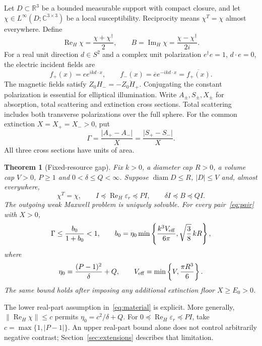 \documentclass[11pt]{article}
\newtheorem{theorem}{Theorem}[section]
\newcommand{\ReH}{\operatorname{Re}_{\!H}}
\newcommand{\ImH}{\operatorname{Im}_{\!H}}
\newcommand{\norm}[1]{\lVert #1\rVert}
\newcommand{\abs}[1]{\lvert #1\rvert}
\begin{document}
Let $D\subset\mathbb R^3$ be a bounded measurable support with compact closure, and let $\chi\in L^\infty(D;\mathbb C^{3\times3})$ be a local susceptibility. Reciprocity means $\chi^T=\chi$ almost everywhere. Define
\[
 \ReH\chi=\frac{\chi+\chi^\dagger}{2},\qquad
 B=\ImH\chi=\frac{\chi-\chi^\dagger}{2i}.
\]
For a real unit direction $d\in S^2$ and a complex unit polarization $e^\dagger e=1$, $d\cdot e=0$, the electric incident fields are
\begin{equation}\label{eq:pair}
 f_+(x)=e e^{ikd\cdot x},\qquad
 f_-(x)=\overline e e^{-ikd\cdot x}=\overline{f_+(x)}.
\end{equation}
The magnetic fields satisfy $Z_0H_-=-\overline{Z_0H_+}$. Conjugating the constant polarization is essential for elliptical illumination. Write $A_\pm,S_\pm,X_\pm$ for absorption, total scattering and extinction cross sections. Total scattering includes both transverse polarizations over the full sphere. For the common extinction $X=X_+=X_->0$, put
\begin{equation}\label{eq:gamma}
 \Gamma=\frac{\abs{A_+-A_-}}{X}
       =\frac{\abs{S_+-S_-}}{X}.
\end{equation}
All three cross sections have units of area.

\begin{theorem}[Fixed-resource gap]\label{thm:main}
Fix $k>0$, a diameter cap $R>0$, a volume cap $V>0$, $P\geq1$ and $0<\delta\leq Q<\infty$. Suppose $\operatorname{diam}D\leq R$, $\abs D\leq V$ and, almost everywhere,
\begin{equation}\label{eq:material}
 \chi^T=\chi,\qquad
 I\preceq\ReH\varepsilon_r\preceq PI,\qquad
 \delta I\preceq B\preceq QI.
\end{equation}
The outgoing weak Maxwell problem is uniquely solvable. For every pair~\eqref{eq:pair} with $X>0$,
\begin{equation}\label{eq:main}
 \Gamma\leq\frac{b_0}{1+b_0}<1,\qquad
 b_0=\eta_0\min\left\{\frac{k^3V_{\rm eff}}{6\pi},
                          \sqrt{\frac38}\,kR\right\},
\end{equation}
where
\begin{equation}\label{eq:resources}
 \eta_0=\frac{(P-1)^2}{\delta}+Q,\qquad
 V_{\rm eff}=\min\left\{V,\frac{\pi R^3}{6}\right\}.
\end{equation}
The same bound holds after imposing any additional extinction floor $X\geq E_0>0$.
\end{theorem}

The lower real-part assumption in~\eqref{eq:material} is explicit. More generally, $\norm{\ReH\chi}\leq c$ permits $\eta_0=c^2/\delta+Q$. For $0\preceq\ReH\varepsilon_r\preceq PI$, take $c=\max\{1,\abs{P-1}\}$. An upper real-part bound alone does not control arbitrarily negative contrast; Section~\ref{sec:extensions} describes that limitation.
\end{document}
